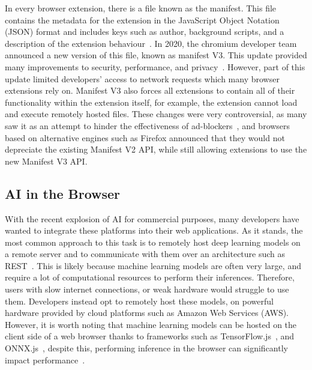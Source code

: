 \documentclass{report}
\begin{document}
In every browser extension, there is a file known as the manifest. This file contains the metadata for the extension in the JavaScript Object Notation (JSON) format and includes keys such as author, background scripts, and a description of the extension behaviour~\cite{bengtsson2020manifest}. In 2020, the chromium developer team announced a new version of this file, known as manifest V3. This update provided many improvements to security, performance, and privacy~\cite{li2020manifest,}. However, part of this update limited developers' access to network requests which many browser extensions rely on. Manifest V3 also forces all extensions to contain all of their functionality within the extension itself, for example, the extension cannot load and execute remotely hosted files. These changes were very controversial, as many saw it as an attempt to hinder the effectiveness of ad-blockers~\cite{barnett2021chrome}, and browsers based on alternative engines such as Firefox announced that they would not depreciate the existing Manifest V2 API, while still allowing extensions to use the new Manifest V3 API.  

\subsection{AI in the Browser}\label{ssec:ai-in-the-browser}

With the recent explosion of AI for commercial purposes, many developers have wanted to integrate these platforms into their web applications. As it stands, the most common approach to this task is to remotely host deep learning models on a remote server and to communicate with them over an architecture such as REST~\cite{fielding2000phd}. This is likely because machine learning models are often very large, and require a lot of computational resources to perform their inferences. Therefore, users with slow internet connections, or weak hardware would struggle to use them. Developers instead opt to remotely host these models, on powerful hardware provided by cloud platforms such as Amazon Web Services (AWS). However, it is worth noting that machine learning models can be hosted on the client side of a web browser thanks to frameworks such as TensorFlow.js~\cite{tensorflow2015whitepaper}, and ONNX.js~\cite{onnxruntime}, despite this, performing inference in the browser can significantly impact performance~\cite{yun2019moving}. 

\end{document}
